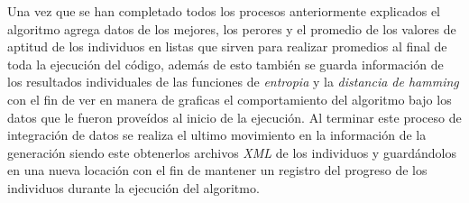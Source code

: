 Una vez que se han completado todos los procesos anteriormente explicados el
algoritmo agrega datos de los mejores, los perores y el promedio de los valores
de aptitud de los individuos en listas que sirven para realizar promedios al
final de toda la ejecución del código, además de esto también se guarda
información de los resultados individuales de las funciones de \textit{entropia}
y la \textit{distancia de hamming} con el fin de ver en manera de graficas el
comportamiento del algoritmo bajo los datos que le fueron proveídos al inicio de
la ejecución. Al terminar este proceso de integración de datos se realiza el
ultimo movimiento en la información de la generación siendo este obtenerlos
archivos \textit{XML} de los individuos y guardándolos en una nueva locación con
el fin de mantener un registro del progreso de los individuos durante la
ejecución del algoritmo.